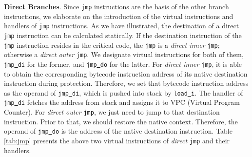 \begin{table}[h]
\renewcommand{\arraystretch}{1.1}
\begin{tabnote}
\end{tabnote}
\end{table}


\textbf{Direct Branches}. Since \texttt{jmp} instructions are the basis of the other branch instructions, we elaborate on the introduction of the virtual instructions and handlers of \texttt{jmp} instructions. As we have illustrated, the destination of a direct \texttt{jmp} instruction can be calculated statically. If the destination instruction of the \texttt{jmp} instruction resides in the critical code, the \texttt{jmp} is a \textit{direct inner} \texttt{jmp}; otherwise a \textit{direct outer} \texttt{jmp}. We designate virtual instructions for both of them, \texttt{jmp\underline{ }di} for the former, and \texttt{jmp\underline{ }do} for the latter. For \textit{direct inner} \texttt{jmp}, it is able to obtain the corresponding bytecode instruction address of its native destination instruction during protection. Therefore, we set that bytecode instruction address as the operand of \texttt{jmp\underline{ }di}, which is pushed into stack by \texttt{load\underline{ }i}. The handler of \texttt{jmp\underline{ }di} fetches the address from stack and assigns it to VPC (Virtual Program Counter). For \textit{direct outer} \texttt{jmp}, we just need to jump to that destination instruction. Prior to that, we should restore the native context. Therefore, the operand of \texttt{jmp\underline{ }do} is the address of the native destination instruction. Table \ref{tab:jmp} presents the above two virtual instructions of \textit{direct} \texttt{jmp} and their handlers.

